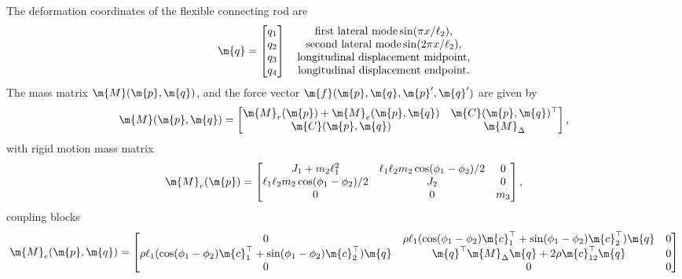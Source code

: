 %
The deformation coordinates of the flexible connecting rod are
%
\begin{equation*}
  \m{q} = \begin{bmatrix}
    q_1 \\
    q_2 \\
    q_3 \\
    q_4
  \end{bmatrix} \quad \begin{matrix}
    \text{first lateral mode} \sin(\pi x/\ell_2) \text{,} \\
    \text{second lateral mode} \sin(2\pi x/\ell_2) \text{,} \\
    \text{longitudinal displacement midpoint,} \\
    \text{longitudinal displacement endpoint.}
  \end{matrix}
\end{equation*}
%
The mass matrix $\m{M}(\m{p}, \m{q})$, and the force vector $\m{f}(\m{p}, \m{q}, \m{p}^\prime, \m{q}^\prime)$ are given by
%
\begin{equation}
  \m{M}(\m{p}, \m{q}) = \begin{bmatrix}
    \m{M}_r(\m{p}) + \m{M}_e(\m{p}, \m{q}) & \m{C}(\m{p}, \m{q})^\top \\
    \m{C}(\m{p}, \m{q})                    & \m{M}_{\Delta}
  \end{bmatrix} \text{,}
\end{equation}
%
with rigid motion mass matrix
%
\begin{equation*}
  \m{M}_r(\m{p}) = \begin{bmatrix}
    J_1+m_2 \ell_1^2 & \ell_1 \ell_2 m_2 \cos(\phi_1 - \phi_2)/2 & 0 \\
    \ell_1 \ell_2 m_2 \cos(\phi_1 - \phi_2)/2 & J_2 & 0 \\
    0 & 0 & m_3
  \end{bmatrix} \text{,}
\end{equation*}
%
coupling blocks
%
\begin{equation*}
  \m{M}_e(\m{p}, \m{q}) = \begin{bmatrix}
    0 & \rho \ell_1(\cos(\phi_1 - \phi_2)\m{c}_1^\top + \sin(\phi_1 - \phi_2)\m{c}_2^\top) \m{q} & 0 \\
    \rho \ell_1(\cos(\phi_1 - \phi_2)\m{c}_1^\top + \sin(\phi_1 - \phi_2)\m{c}_2^\top) \m{q} & \m{q}^\top\m{M}_{\Delta}\m{q} + 2\rho\m{c}_{12}^\top\m{q} & 0 \\
    0 & 0 & 0
  \end{bmatrix}
\end{equation*}
